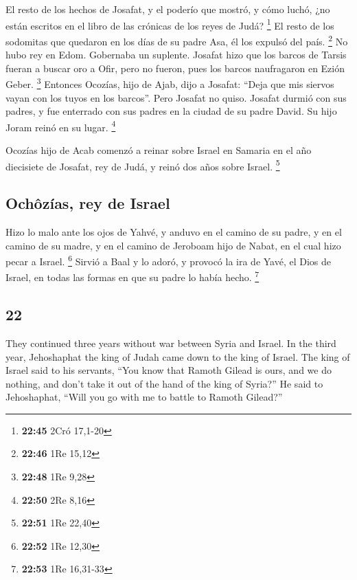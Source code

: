 \begin{paracol}{2}
 El resto de los hechos de Josafat, y el poderío que
mostró, y cómo luchó, ¿no están escritos en el libro de las crónicas de
los reyes de Judá? \footnote{\textbf{22:45} 2Cró 17,1-20}
 El resto de los sodomitas que quedaron en los días de su
padre Asa, él los expulsó del país. \footnote{\textbf{22:46} 1Re 15,12}
 No hubo rey en Edom. Gobernaba un suplente.
 Josafat hizo que los barcos de Tarsis fueran a buscar
oro a Ofir, pero no fueron, pues los barcos naufragaron en Ezión Geber.
\footnote{\textbf{22:48} 1Re 9,28}  Entonces Ocozías,
hijo de Ajab, dijo a Josafat: ``Deja que mis siervos vayan con los tuyos
en los barcos''. Pero Josafat no quiso.  Josafat durmió
con sus padres, y fue enterrado con sus padres en la ciudad de su padre
David. Su hijo Joram reinó en su lugar. \footnote{\textbf{22:50} 2Re
  8,16}

 Ocozías hijo de Acab comenzó a reinar sobre Israel en
Samaria en el año diecisiete de Josafat, rey de Judá, y reinó dos años
sobre Israel. \footnote{\textbf{22:51} 1Re 22,40}

\hypertarget{ochuxf4zuxedas-rey-de-israel}{%
\subsection{Ochôzías, rey de
Israel}\label{ochuxf4zuxedas-rey-de-israel}}

 Hizo lo malo ante los ojos de Yahvé, y anduvo en el
camino de su padre, y en el camino de su madre, y en el camino de
Jeroboam hijo de Nabat, en el cual hizo pecar a Israel. \footnote{\textbf{22:52}
  1Re 12,30}  Sirvió a Baal y lo adoró, y provocó la ira
de Yavé, el Dios de Israel, en todas las formas en que su padre lo había
hecho. \footnote{\textbf{22:53} 1Re 16,31-33} \switchcolumn
\begin{otherlanguage}{english}

\hypertarget{section-43}{%
\section{22}\label{section-43}}

 They continued three years without war between Syria and
Israel.  In the third year, Jehoshaphat the king of Judah
came down to the king of Israel.  The king of Israel said
to his servants, ``You know that Ramoth Gilead is ours, and we do
nothing, and don't take it out of the hand of the king of Syria?''
 He said to Jehoshaphat, ``Will you go with me to battle
to Ramoth Gilead?''


\end{otherlanguage}
\end{paracol}
